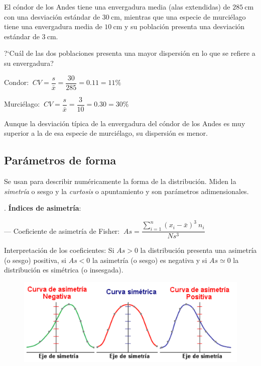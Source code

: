 	
\vspace{5mm}%
\begin{ejemplo}
\begin{ejre} El cóndor de los Andes tiene una envergadura media (alas extendidas) de $285 \ \mathrm{cm}$ con una desviación estándar de $30 \ \mathrm{cm}$, mientras que una especie de murciélago tiene una envergadura media de $10 \ \mathrm{cm}$ y su población presenta una desviación estándar de $3 \ \mathrm{cm}$.

?`Cuál de las dos poblaciones presenta una mayor dispersión en lo que se refiere a su envergadura?	

\vspace{4mm} Condor: $\ CV=\dfrac{s}{\bar x}=\dfrac{30}{285}=0.11=11\%$

Murciélago: $\ CV=\dfrac{s}{\bar x}=\dfrac{3}{10}=0.30=30\%$

Aunque la desviación típica de la envergadura del cóndor de los Andes es muy superior a la de esa especie de murciélago, su dispersión es menor.
\end{ejre}
\end{ejemplo}

\subsection{Parámetros de forma}

Se usan para describir numéricamente la forma de la distribución. Miden la \emph{simetría} o sesgo y la \emph{curtosis} o apuntamiento y son parámetros adimensionales.

\vspace{5mm}%
\begin{definition}
	. \textbf{Índices de asimetría}:
	
	
	\vspace{2mm} --- Coeficiente de asimetría de Fisher: $\ As=\dfrac{\displaystyle \sum_{i=1}^n (x_i-\bar x)^3 \ n_i}{N s^3}$
	
	\vspace{4mm} Interpretación de los coeficientes: Si $As>0$ la distribución presenta una asimetría (o sesgo) positiva, si $As<0$ la asimetría (o sesgo) es negativa y si $As\simeq 0$ la distribución es simétrica (o insesgada).
	
	\begin{figure}[H]
			\centering
			\includegraphics[width=.75\textwidth]{imagenes/imagenes01/T01IM18.png}
	\end{figure}
\end{definition}

